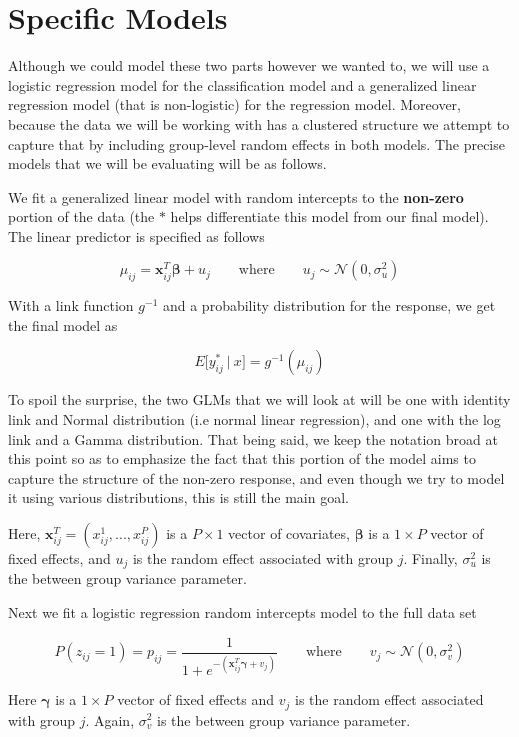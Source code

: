 \documentclass[12pt,twoside]{reedthesis}
\begin{document}
\hypertarget{specificmods}{%
\section{Specific Models}\label{specificmods}}

Although we could model these two parts however we wanted to, we will use a logistic regression model for the classification model and a generalized linear regression model (that is non-logistic) for the regression model. Moreover, because the data we will be working with has a clustered structure we attempt to capture that by including group-level random effects in both models. The precise models that we will be evaluating will be as follows.

We fit a generalized linear model with random intercepts to the \textbf{non-zero} portion of the data (the \(*\) helps differentiate this model from our final model). The linear predictor is specified as follows

\[
\mu_{ij} = \mathbf{x}_{ij}^T\boldsymbol{\beta} + u_j  \qquad \text{where} \qquad u_j \sim \mathcal{N}(0, \sigma_{u}^2)
\]

With a link function \(g^{-1}\) and a probability distribution for the response, we get the final model as

\[
E\big[y^*_{ij} \ | \ x\big] = g^{-1}(\mu_{ij})
\]

To spoil the surprise, the two GLMs that we will look at will be one with identity link and Normal distribution (i.e normal linear regression), and one with the log link and a Gamma distribution. That being said, we keep the notation broad at this point so as to emphasize the fact that this portion of the model aims to capture the structure of the non-zero response, and even though we try to model it using various distributions, this is still the main goal.

Here, \(\mathbf{x}_{ij}^T = (x^1_{ij}, ..., x^P_{ij})\) is a \(P\times 1\) vector of covariates, \(\boldsymbol{\beta}\) is a \(1\times P\) vector of fixed effects, and \(u_j\) is the random effect associated with group \(j\). Finally, \(\sigma^2_{u}\) is the between group variance parameter.

Next we fit a logistic regression random intercepts model to the full data set

\[
P(z_{ij} = 1) = p_{ij} = \frac{1}{1 + e^{-(\mathbf{x}_{ij}^T\boldsymbol{\gamma} + v_j)}} \qquad \text{where} \qquad v_j \sim \mathcal{N}(0, \sigma_{v}^2)
\]

Here \(\boldsymbol{\gamma}\) is a \(1\times P\) vector of fixed effects and \(v_j\) is the random effect associated with group \(j\). Again, \(\sigma^2_{v}\) is the between group variance parameter.
\end{document}
